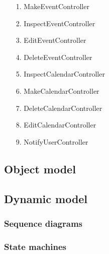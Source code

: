 \begin{enumerate}
	\item[1.] MakeEventController
	\item[2.] InspectEventController
	\item[3.] EditEventController 
	\item[4.] DeleteEventController
	\item[5.] InspectCalendarController
	\item[6.] MakeCalendarController
	\item[7.] DeleteCalendarController
	\item[8.] EditCalendarController 
	\item[9.] NotifyUserController 
\end{enumerate}

\subsection{Object model}



\subsection{Dynamic model}



\subsubsection{Sequence diagrams}



\subsubsection{State machines}



\newpage
